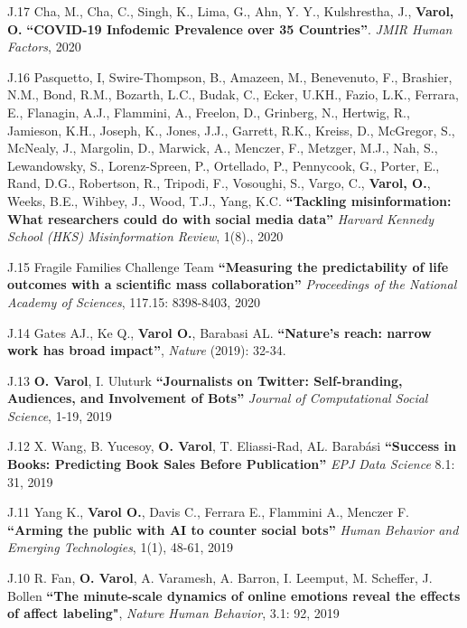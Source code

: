 \documentclass[10pt]{article}
\newenvironment{innerlist}[1][\enskip\textbullet]%
        {\begin{compactitem}[#1]}{\end{compactitem}}
\begin{document}
\begin{innerlist}
\item[J.17] Cha, M., Cha, C., Singh, K., Lima, G., Ahn, Y. Y., Kulshrestha, J., \textbf{Varol, O.} \textbf{``COVID-19 Infodemic Prevalence over 35 Countries''}. \textit{JMIR Human Factors}, 2020

\item[J.16] Pasquetto, I, Swire-Thompson, B., Amazeen, M., Benevenuto, F., Brashier, N.M., Bond, R.M., Bozarth, L.C., Budak, C., Ecker, U.KH., Fazio, L.K., Ferrara, E., Flanagin, A.J., Flammini, A., Freelon, D., Grinberg, N., Hertwig, R., Jamieson, K.H., Joseph, K., Jones, J.J., Garrett, R.K., Kreiss, D., McGregor, S., McNealy, J., Margolin, D., Marwick, A., Menczer, F., Metzger, M.J., Nah, S., Lewandowsky, S., Lorenz-Spreen, P., Ortellado, P., Pennycook, G., Porter, E., Rand, D.G., Robertson, R., Tripodi, F., Vosoughi, S., Vargo, C., \textbf{Varol, O.}, Weeks, B.E., Wihbey, J., Wood, T.J., Yang, K.C. \textbf{``Tackling misinformation: What researchers could do with social media data''} \textit{Harvard Kennedy School (HKS) Misinformation Review}, 1(8)., 2020

\item[J.15] Fragile Families Challenge Team \textbf{``Measuring the predictability of life outcomes with a scientific mass collaboration''} \textit{Proceedings of the National Academy of Sciences}, 117.15: 8398-8403, 2020

\item[J.14] Gates AJ., Ke Q., \textbf{Varol O.}, Barabasi AL. \textbf{``Nature's reach: narrow work has broad impact''}, \textit{Nature} (2019): 32-34.

\item[J.13] \textbf{O. Varol}, I. Uluturk \textbf{``Journalists on Twitter: Self-branding, Audiences, and Involvement of Bots''} \textit{Journal of Computational Social Science}, 1-19, 2019

\item[J.12] X. Wang, B. Yucesoy, \textbf{O. Varol}, T. Eliassi-Rad, AL. Barabási \textbf{``Success in Books: Predicting Book Sales Before Publication''} \textit{EPJ Data Science} 8.1: 31, 2019

\item[J.11] Yang K., \textbf{Varol O.}, Davis C., Ferrara E., Flammini A., Menczer F. \textbf{``Arming the public with AI to counter social bots''} \textit{Human Behavior and Emerging Technologies}, 1(1), 48-61, 2019

\item[J.10] R. Fan, \textbf{O. Varol}, A. Varamesh, A. Barron, I. Leemput, M. Scheffer, J. Bollen \textbf{``The minute-scale dynamics of online emotions reveal the effects of affect labeling"}, \textit{Nature Human Behavior}, 3.1: 92, 2019


\end{innerlist}
\end{document}
